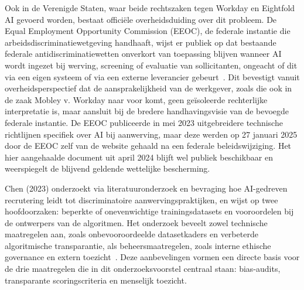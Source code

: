 \documentclass{hogent-article}
\begin{document}
Ook in de Verenigde Staten, waar beide rechtszaken tegen Workday en
Eightfold AI gevoerd worden, bestaat officiële overheidsduiding over dit
probleem. De Equal Employment Opportunity Commission (EEOC), de federale
instantie die arbeidsdiscriminatiewetgeving handhaaft, wijst er publiek op
dat bestaande federale antidiscriminatiewetten onverkort van toepassing
blijven wanneer AI wordt ingezet bij werving, screening of evaluatie van
sollicitanten, ongeacht of dit via een eigen systeem of via een externe
leverancier gebeurt~\autocite{EEOC2024}. Dit bevestigt vanuit
overheidsperspectief dat de aansprakelijkheid van de werkgever, zoals die
ook in de zaak Mobley v. Workday naar voor komt, geen geïsoleerde
rechterlijke interpretatie is, maar aansluit bij de bredere handhavingsvisie
van de bevoegde federale instantie. De EEOC publiceerde in mei 2023
uitgebreidere technische richtlijnen specifiek over AI bij aanwerving, maar
deze werden op 27 januari 2025 door de EEOC zelf van de website gehaald na
een federale beleidswijziging. Het hier aangehaalde document uit april 2024
blijft wel publiek beschikbaar en weerspiegelt de blijvend geldende
wettelijke bescherming.

Chen (2023) onderzoekt via literatuuronderzoek en bevraging hoe AI-gedreven
recrutering leidt tot discriminatoire aanwervingspraktijken, en wijst op
twee hoofdoorzaken: beperkte of onevenwichtige trainingsdatasets en
vooroordelen bij de ontwerpers van de algoritmen. Het onderzoek beveelt zowel
technische maatregelen aan, zoals onbevooroordeelde datasetkaders en
verbeterde algoritmische transparantie, als beheersmaatregelen, zoals interne
ethische governance en extern toezicht~\autocite{Chen2023}. Deze aanbevelingen
vormen een directe basis voor de drie maatregelen die in dit
onderzoeksvoorstel centraal staan: bias-audits, transparante
scoringscriteria en menselijk toezicht.
\end{document}
